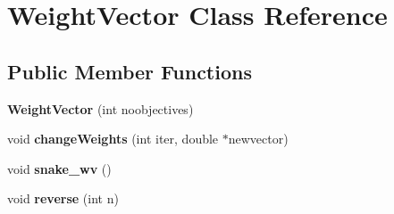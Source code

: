 \hypertarget{class_weight_vector}{}\section{Weight\+Vector Class Reference}
\label{class_weight_vector}
\subsection*{Public Member Functions}
\begin{DoxyCompactItemize}
\item 
\hypertarget{class_weight_vector_a27e1e70e19cb737aaf539f9aaaa063f7}{}{\bfseries Weight\+Vector} (int noobjectives)\label{class_weight_vector_a27e1e70e19cb737aaf539f9aaaa063f7}

\item 
\hypertarget{class_weight_vector_a755bd9ad97264e9f9d1573d8faf468b4}{}void {\bfseries change\+Weights} (int iter, double $\ast$newvector)\label{class_weight_vector_a755bd9ad97264e9f9d1573d8faf468b4}

\item 
\hypertarget{class_weight_vector_a4886c3534efca201272efbb384d8199b}{}void {\bfseries snake\+\_\+wv} ()\label{class_weight_vector_a4886c3534efca201272efbb384d8199b}

\item 
\hypertarget{class_weight_vector_aaffade8f06de61afcf06c0575b7cb62b}{}void {\bfseries reverse} (int n)\label{class_weight_vector_aaffade8f06de61afcf06c0575b7cb62b}

\end{DoxyCompactItemize}
